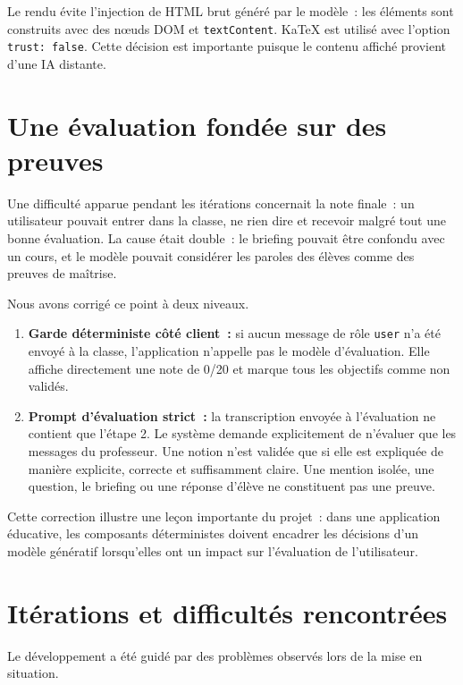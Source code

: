 \documentclass[11pt,a4paper]{article}
\begin{document}
Le rendu évite l'injection de HTML brut généré par le modèle~: les éléments sont construits avec des nœuds DOM et \texttt{textContent}. KaTeX est utilisé avec l'option \texttt{trust: false}. Cette décision est importante puisque le contenu affiché provient d'une IA distante.

\section{Une évaluation fondée sur des preuves}

Une difficulté apparue pendant les itérations concernait la note finale~: un utilisateur pouvait entrer dans la classe, ne rien dire et recevoir malgré tout une bonne évaluation. La cause était double~: le briefing pouvait être confondu avec un cours, et le modèle pouvait considérer les paroles des élèves comme des preuves de maîtrise.

Nous avons corrigé ce point à deux niveaux.

\begin{enumerate}
  \item \textbf{Garde déterministe côté client~:} si aucun message de rôle \texttt{user} n'a été envoyé à la classe, l'application n'appelle pas le modèle d'évaluation. Elle affiche directement une note de 0/20 et marque tous les objectifs comme non validés.
  \item \textbf{Prompt d'évaluation strict~:} la transcription envoyée à l'évaluation ne contient que l'étape 2. Le système demande explicitement de n'évaluer que les messages du professeur. Une notion n'est validée que si elle est expliquée de manière explicite, correcte et suffisamment claire. Une mention isolée, une question, le briefing ou une réponse d'élève ne constituent pas une preuve.
\end{enumerate}

Cette correction illustre une leçon importante du projet~: dans une application éducative, les composants déterministes doivent encadrer les décisions d'un modèle génératif lorsqu'elles ont un impact sur l'évaluation de l'utilisateur.

\section{Itérations et difficultés rencontrées}

Le développement a été guidé par des problèmes observés lors de la mise en situation.
\end{document}
